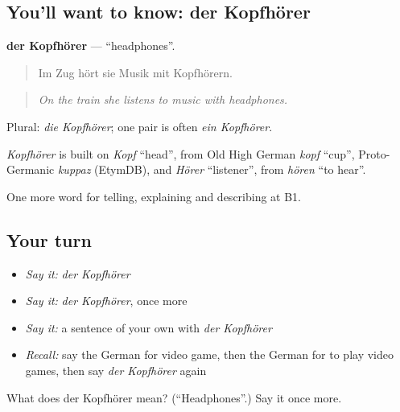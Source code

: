 \subsection*{You'll want to know: der Kopfhörer}
\textbf{der Kopfhörer} — \textquotedblleft{}headphones\textquotedblright{}.

\begin{quote}
Im Zug hört sie Musik mit Kopfhörern.
\end{quote}

\begin{quote}
\emph{On the train she listens to music with headphones.}
\end{quote}

Plural: \emph{die Kopfhörer}; one pair is often \emph{ein Kopfhörer}.

\begin{cousinweb}
\emph{Kopfhörer} is built on \emph{Kopf} \textquotedblleft{}head\textquotedblright{}, from Old High German \emph{kopf} \textquotedblleft{}cup\textquotedblright{}, Proto-Germanic \emph{kuppaz} (EtymDB), and \emph{Hörer} \textquotedblleft{}listener\textquotedblright{}, from \emph{hören} \textquotedblleft{}to hear\textquotedblright{}.
\end{cousinweb}

\begin{grammarlens}[title={What you've built}]
One more word for telling, explaining and describing at B1.
\end{grammarlens}

\subsection*{Your turn}
\begin{itemize}
\raggedright
  \item \emph{Say it:} \emph{der Kopfhörer}
  \item \emph{Say it:} \emph{der Kopfhörer}, once more
  \item \emph{Say it:} a sentence of your own with \emph{der Kopfhörer}
  \item \emph{Recall:} say the German for video game, then the German for to play video games, then say \emph{der Kopfhörer} again
\end{itemize}

\begin{tcolorbox}[breakable,colback=teal!4,colframe=teal!35!black,title={Before you move on}]
What does der Kopfhörer mean? (\textquotedblleft{}Headphones\textquotedblright{}.) Say it once more.
\end{tcolorbox}
